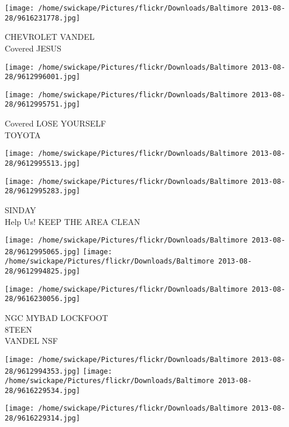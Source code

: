 \documentclass[10pt,letterpaper]{article}
\begin{document}
\vspace{0.25in}
\texttt{[image: /home/swickape/Pictures/flickr/Downloads/Baltimore 2013-08-28/9616231778.jpg]}

CHEVROLET VANDEL\\
Covered JESUS\\
\pagebreak

\texttt{[image: /home/swickape/Pictures/flickr/Downloads/Baltimore 2013-08-28/9612996001.jpg]}

\vspace{0.25in}
\texttt{[image: /home/swickape/Pictures/flickr/Downloads/Baltimore 2013-08-28/9612995751.jpg]}

Covered LOSE YOURSELF\\
TOYOTA\\
\pagebreak

\texttt{[image: /home/swickape/Pictures/flickr/Downloads/Baltimore 2013-08-28/9612995513.jpg]}

\vspace{0.25in}
\texttt{[image: /home/swickape/Pictures/flickr/Downloads/Baltimore 2013-08-28/9612995283.jpg]}

SINDAY\\
Help Us! KEEP THE AREA CLEAN\\
\pagebreak

\texttt{[image: /home/swickape/Pictures/flickr/Downloads/Baltimore 2013-08-28/9612995065.jpg]}
\texttt{[image: /home/swickape/Pictures/flickr/Downloads/Baltimore 2013-08-28/9612994825.jpg]}

\vspace{0.25in}
\texttt{[image: /home/swickape/Pictures/flickr/Downloads/Baltimore 2013-08-28/9616230056.jpg]}

NGC MYBAD LOCKFOOT\\
8TEEN\\
VANDEL NSF\\
\pagebreak

\texttt{[image: /home/swickape/Pictures/flickr/Downloads/Baltimore 2013-08-28/9612994353.jpg]}
\texttt{[image: /home/swickape/Pictures/flickr/Downloads/Baltimore 2013-08-28/9616229534.jpg]}

\vspace{0.25in}
\texttt{[image: /home/swickape/Pictures/flickr/Downloads/Baltimore 2013-08-28/9616229314.jpg]}
\end{document}
